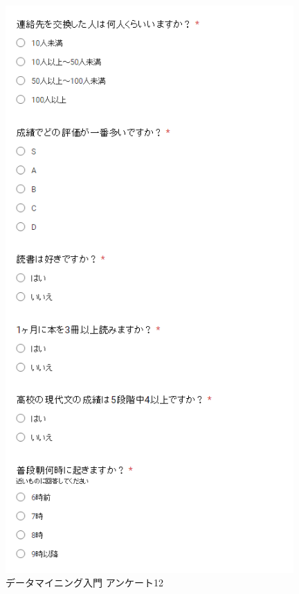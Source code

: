 \begin{figure}[p]
\centering
\includegraphics[width=11cm]{forms12.PNG}
\caption{データマイニング入門 アンケート12}\label{サンプル図}
\end{figure}


